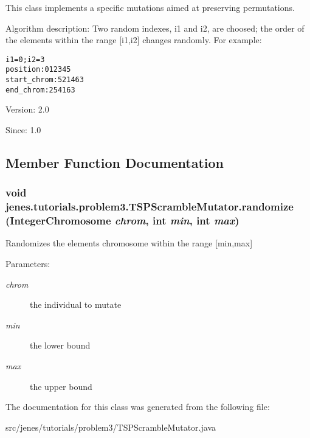 This class implements a specific mutations aimed at preserving permutations.

Algorithm description: Two random indexes, i1 and i2, are choosed; the order of the elements within the range \mbox{[}i1,i2\mbox{]} changes randomly. For example: \small\begin{alltt}
       i1=0; i2=3
       position:    0 1 2 3 4 5
	 start\_chrom: 5 2 1 4 6 3
       end\_chrom:   2 5 4 1 6 3
 \end{alltt}
\normalsize 


\begin{Desc}
\item[Version:]2.0 \end{Desc}
\begin{Desc}
\item[Since:]1.0 \end{Desc}


\subsection{Member Function Documentation}
\hypertarget{classjenes_1_1tutorials_1_1problem3_1_1_t_s_p_scramble_mutator_42d01f9f0cd8138659b8e76fdc41cd1e}{
\subsubsection[randomize]{\setlength{\rightskip}{0pt plus 5cm}void jenes.tutorials.problem3.TSPScrambleMutator.randomize ({\bf IntegerChromosome} {\em chrom}, \/  int {\em min}, \/  int {\em max})}}
\label{classjenes_1_1tutorials_1_1problem3_1_1_t_s_p_scramble_mutator_42d01f9f0cd8138659b8e76fdc41cd1e}


Randomizes the elements chromosome within the range \mbox{[}min,max\mbox{]} 

\begin{Desc}
\item[Parameters:]
\begin{description}
\item[{\em chrom}]the individual to mutate \item[{\em min}]the lower bound \item[{\em max}]the upper bound \end{description}
\end{Desc}


The documentation for this class was generated from the following file:\begin{CompactItemize}
\item 
src/jenes/tutorials/problem3/TSPScrambleMutator.java\end{CompactItemize}
